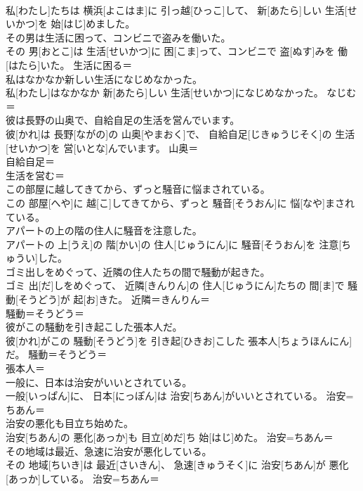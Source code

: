 \documentclass[8pt]{extreport}
\begin{document}
\begin{CJK}{UTF8}{min}
\\	私[わたし]たちは 横浜[よこはま]に 引っ越[ひっこ]して、 新[あたら]しい 生活[せいかつ]を 始[はじ]めました。	
\\	その男は生活に困って、コンビニで盗みを働いた。	
\\	その 男[おとこ]は 生活[せいかつ]に 困[こま]って、コンビニで 盗[ぬす]みを 働[はたら]いた。	生活に困る＝ 
\\	私はなかなか新しい生活になじめなかった。	
\\	私[わたし]はなかなか 新[あたら]しい 生活[せいかつ]になじめなかった。	なじむ＝ 
\\	彼は長野の山奥で、自給自足の生活を営んでいます。	
\\	彼[かれ]は 長野[ながの]の 山奥[やまおく]で、 自給自足[じきゅうじそく]の 生活[せいかつ]を 営[いとな]んでいます。	山奥＝ 
\\	自給自足＝ 
\\	生活を営む＝ 
\\	この部屋に越してきてから、ずっと騒音に悩まされている。	
\\	この 部屋[へや]に 越[こ]してきてから、ずっと 騒音[そうおん]に 悩[なや]まされている。	
\\	アパートの上の階の住人に騒音を注意した。	
\\	アパートの 上[うえ]の 階[かい]の 住人[じゅうにん]に 騒音[そうおん]を 注意[ちゅうい]した。	
\\	ゴミ出しをめぐって、近隣の住人たちの間で騒動が起きた。	
\\	ゴミ 出[だ]しをめぐって、 近隣[きんりん]の 住人[じゅうにん]たちの 間[ま]で 騒動[そうどう]が 起[お]きた。	近隣＝きんりん＝ 
\\	騒動＝そうどう＝ 
\\	彼がこの騒動を引き起こした張本人だ。	
\\	彼[かれ]がこの 騒動[そうどう]を 引き起[ひきお]こした 張本人[ちょうほんにん]だ。	騒動＝そうどう＝ 
\\	張本人＝ 
\\	一般に、日本は治安がいいとされている。	
\\	一般[いっぱん]に、 日本[にっぽん]は 治安[ちあん]がいいとされている。	治安=ちあん＝ 
\\	治安の悪化も目立ち始めた。	
\\	治安[ちあん]の 悪化[あっか]も 目立[めだ]ち 始[はじ]めた。	治安=ちあん＝ 
\\	その地域は最近、急速に治安が悪化している。	
\\	その 地域[ちいき]は 最近[さいきん]、 急速[きゅうそく]に 治安[ちあん]が 悪化[あっか]している。	治安=ちあん＝ 

\end{CJK}
\end{document}
